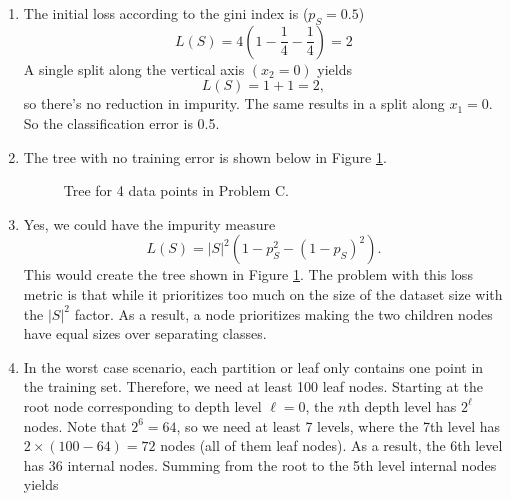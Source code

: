 \documentclass[12pt]{article}
\begin{document}
\begin{enumerate}[leftmargin=*]
\begin{enumerate}[label=\Alph*.]
\begin{enumerate}
\item The initial loss according to the gini index is ($p_S = 0.5$)
\[ L(S) = 4 \left( 1 - \frac{1}{4} - \frac{1}{4} \right) = 2 \]
A single split along the vertical axis $(x_2 = 0)$ yields
\[ L(S) = 1 + 1 = 2, \]
so there's no reduction in impurity. The same results in a split along $x_1 = 0$. So the classification error is 0.5.
\item The tree with no training error is shown below in Figure \ref{tree}.
\begin{figure}[h!]
\centering
{}
\caption{Tree for 4 data points in Problem C.} \label{tree}
\end{figure}
\item Yes, we could have the impurity measure
\[ L(S) = |S|^2 \left( 1 - p_S^2 - (1 - p_S)^2 \right). \]
This would create the tree shown in Figure \ref{tree}. The problem with this loss metric is that while it prioritizes too much on the size of the dataset size with the $|S|^2$ factor. As a result, a node prioritizes making the two children nodes have equal sizes over separating classes.
\item In the worst case scenario, each partition or leaf only contains one point in the training set. Therefore, we need at least 100 leaf nodes. Starting at the root node corresponding to depth level $\ell = 0$, the $n$th depth level has $2^\ell$ nodes. Note that $2^6 = 64$, so we need at least 7 levels, where the 7th level has $2 \times (100 - 64) = 72$ nodes (all of them leaf nodes). As a result, the 6th level has $36$ internal nodes. Summing from the root to the 5th level internal nodes yields

\end{enumerate}
\end{enumerate}
\end{enumerate}
\end{document}

